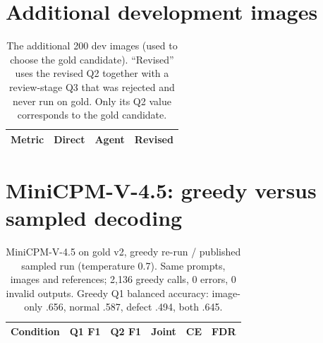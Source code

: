 \documentclass[11pt]{article}
\begin{document}



\appendix
\section{Additional development images}
\begin{table}[h]
\centering
\caption{The additional 200 dev images (used to choose the gold candidate). ``Revised'' uses the revised Q2 together with a review-stage Q3 that was rejected and never run on gold. Only its Q2 value corresponds to the gold candidate.}
\label{tab:dev}
\begin{tabular}{lrrr}
\toprule
Metric & Direct & Agent & Revised \\
\midrule

\bottomrule
\end{tabular}
\end{table}

\section{MiniCPM-V-4.5: greedy versus sampled decoding}
\begin{table}[h]
\centering
\caption{MiniCPM-V-4.5 on gold v2, greedy re-run / published sampled run (temperature 0.7). Same prompts, images and references; 2,136 greedy calls, 0 errors, 0 invalid outputs. Greedy Q1 balanced accuracy: image-only .656, normal .587, defect .494, both .645.}
\label{tab:minicpm}
\small
\begin{tabular}{lrrrrr}
\toprule
Condition & Q1 F1 & Q2 F1 & Joint & CE & FDR \\
\midrule

\bottomrule
\end{tabular}
\end{table}
\end{document}
